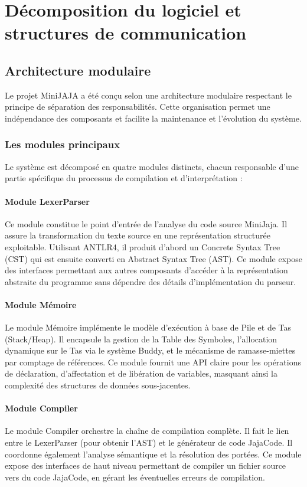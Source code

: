 \section{Décomposition du logiciel et structures de communication}

\subsection{Architecture modulaire}

Le projet MiniJAJA a été conçu selon une architecture modulaire respectant le principe de séparation des responsabilités. Cette organisation permet une indépendance des composants et facilite la maintenance et l'évolution du système.

\subsubsection{Les modules principaux}

Le système est décomposé en quatre modules distincts, chacun responsable d'une partie spécifique du processus de compilation et d'interprétation :

\paragraph{Module LexerParser}
Ce module constitue le point d'entrée de l'analyse du code source MiniJaja. Il assure la transformation du texte source en une représentation structurée exploitable. Utilisant ANTLR4, il produit d'abord un Concrete Syntax Tree (CST) qui est ensuite converti en Abstract Syntax Tree (AST). Ce module expose des interfaces permettant aux autres composants d'accéder à la représentation abstraite du programme sans dépendre des détails d'implémentation du parseur.

\paragraph{Module Mémoire}
Le module Mémoire implémente le modèle d'exécution à base de Pile et de Tas (Stack/Heap). Il encapsule la gestion de la Table des Symboles, l'allocation dynamique sur le Tas via le système Buddy, et le mécanisme de ramasse-miettes par comptage de références. Ce module fournit une API claire pour les opérations de déclaration, d'affectation et de libération de variables, masquant ainsi la complexité des structures de données sous-jacentes.

\paragraph{Module Compiler}
Le module Compiler orchestre la chaîne de compilation complète. Il fait le lien entre le LexerParser (pour obtenir l'AST) et le générateur de code JajaCode. Il coordonne également l'analyse sémantique et la résolution des portées. Ce module expose des interfaces de haut niveau permettant de compiler un fichier source vers du code JajaCode, en gérant les éventuelles erreurs de compilation.

